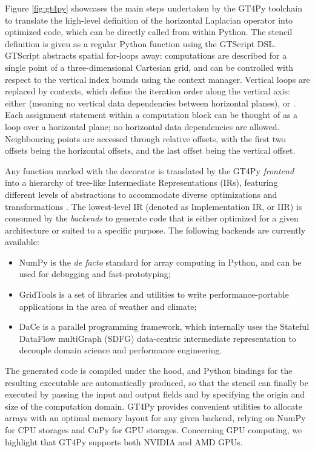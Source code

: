 \documentclass[gmd,manuscript,online]{copernicus}
\begin{document}
	Figure \ref{fig:gt4py} showcases the main steps undertaken by the GT4Py toolchain to translate the high-level definition of the horizontal Laplacian operator into optimized code, which can be directly called from within Python. The stencil definition is given as a regular Python function using the GTScript DSL. GTScript abstracts spatial for-loops away: computations are described for a single point of a three-dimensional Cartesian grid, and can be controlled with respect to the vertical index bounds using the  context manager. Vertical loops are replaced by  contexts, which define the iteration order along the vertical axis: either  (meaning no vertical data dependencies between horizontal planes),  or . Each assignment statement within a computation block can be thought of as a loop over a horizontal plane; no horizontal data dependencies are allowed. Neighbouring points are accessed through relative offsets, with the first two offsets being the horizontal offsets, and the last offset being the vertical offset.

	Any function marked with the  decorator is translated by the GT4Py \emph{frontend} into a hierarchy of tree-like Intermediate Representations (IRs), featuring different levels of abstractions to accommodate diverse optimizations and transformations \citep{gysi21}. The lowest-level IR (denoted as Implementation IR, or IIR) is consumed by the \emph{backends} to generate code that is either optimized for a given architecture or suited to a specific purpose. The following backends are currently available:
	\begin{itemize}
		\item NumPy \citep{harris20} is the \emph{de facto} standard for array computing in Python, and can be used for debugging and fast-prototyping;
		\item GridTools \citep{afanasyev21} is a set of libraries and utilities to write performance-portable applications in the area of weather and climate;
		\item DaCe \citep{ben-nun19} is a parallel programming framework, which internally uses the Stateful DataFlow multiGraph (SDFG) data-centric intermediate representation to decouple domain science and performance engineering.
	\end{itemize}
	The generated code is compiled under the hood, and Python bindings for the resulting executable are automatically produced, so that the stencil can finally be executed by passing the input and output fields and by specifying the origin and size of the computation domain. GT4Py provides convenient utilities to allocate arrays with an optimal memory layout for any given backend, relying on NumPy for CPU storages and CuPy \citep{nishino17} for GPU storages. Concerning GPU computing, we highlight that GT4Py supports both NVIDIA and AMD GPUs.
\end{document}
